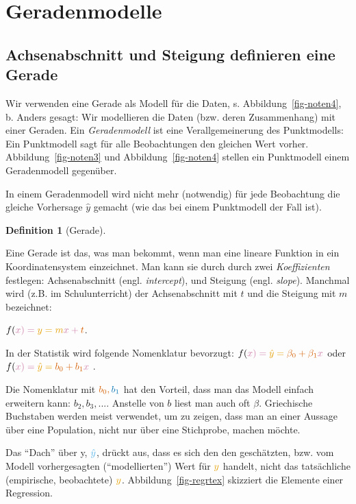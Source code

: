 \documentclass[
  letterpaper,
  oneside,
  open=any]{scrbook}
\theoremstyle{definition}
\theoremstyle{definition}
\theoremstyle{definition}
\newtheorem{definition}{Definition}[chapter]
\theoremstyle{remark}
\begin{document}
\section{Geradenmodelle}\label{geradenmodelle-1}

\subsection{Achsenabschnitt und Steigung definieren eine
Gerade}\label{achsenabschnitt-und-steigung-definieren-eine-gerade}

Wir verwenden eine Gerade als Modell für die Daten, s.
Abbildung~\ref{fig-noten4}, b. Anders gesagt: Wir modellieren die Daten
(bzw. deren Zusammenhang) mit einer Geraden. Ein \emph{Geradenmodell}
ist eine Verallgemeinerung des Punktmodells: Ein Punktmodell sagt für
alle Beobachtungen den gleichen Wert vorher. Abbildung~\ref{fig-noten3}
und Abbildung~\ref{fig-noten4} stellen ein Punktmodell einem
Geradenmodell gegenüber.

In einem Geradenmodell wird nicht mehr (notwendig) für jede Beobachtung
die gleiche Vorhersage \(\hat{y}\) gemacht (wie das bei einem
Punktmodell der Fall ist).

\begin{definition}[Gerade]\protect\hypertarget{def-gerade}{}\label{def-gerade}

Eine Gerade ist das, was man bekommt, wenn man eine lineare Funktion in
ein Koordinatensystem einzeichnet. Man kann sie durch durch zwei
\emph{Koeffizienten} festlegen: Achsenabschnitt (engl.
\emph{intercept}), und Steigung (engl. \emph{slope}). Manchmal wird
(z.B. im Schulunterricht) der Achsenabschnitt mit \(t\) und die Steigung
mit \(m\) bezeichnet:

\(f(\color{xcol}{x})=\color{ycol}{y}={m} \color{xcol}{x} + \color{beta0col}{t}\).

In der Statistik wird folgende Nomenklatur bevorzugt:
\(f(\color{xcol}{x})=\color{ycol}{\hat{y}}=\color{beta0col}{\beta_0} + {\beta_1} \color{xcol}{x}\)
oder
\(f(\color{xcol}{x})=\color{ycol}{\hat{y}}= \color{beta0col}{b_0} + {b_1} \color{xcol}{x}\)
.

Die Nomenklatur mit \(\color{beta0col}{b_0}, \color{beta1col}{b_1}\) hat
den Vorteil, dass man das Modell einfach erweitern kann:
\(b_2, b_3, ...\). Anstelle von \(b\) liest man auch oft \(\beta\).
Griechische Buchstaben werden meist verwendet, um zu zeigen, dass man an
einer Aussage über eine Population, nicht nur über eine Stichprobe,
machen möchte.

Das \enquote{Dach} über y, \(\color{modelcol}{\hat{y}}\), drückt aus,
dass es sich den den geschätzten, bzw. vom Modell vorhergesagten
(\enquote{modellierten}) Wert für \(\color{ycol}{y}\) handelt, nicht das
tatsächliche (empirische, beobachtete) \(\color{ycol}{y}\).
Abbildung~\ref{fig-regrtex} skizziert die Elemente einer Regression.

\end{definition}
\end{document}

